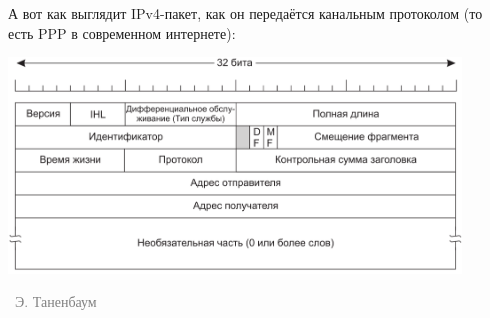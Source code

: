 \documentclass[a5paper]{article}
\newcommand{\attribution}[1] {
\vspace{-5mm}\begin{flushright}\begin{scriptsize}\textcolor{gray}{\textcopyright\, #1}\end{scriptsize}\end{flushright}
}
\begin{document}
А вот как выглядит IPv4-пакет, как он передаётся канальным протоколом (то есть PPP в современном интернете):

\begin{center}
    \includegraphics[width=0.9\textwidth]{ipv4.png}
    \attribution{Э. Таненбаум}
\end{center}
\end{document}
